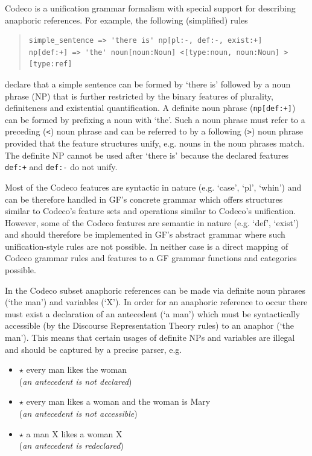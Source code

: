 \documentclass[a4paper]{article}
\begin{document}
Codeco is a unification grammar formalism with special support for describing
anaphoric references. For example, the following (simplified) rules

\small
\begin{quote}
\begin{verbatim}
simple_sentence => 'there is' np[pl:-, def:-, exist:+]
np[def:+] => 'the' noun[noun:Noun] <[type:noun, noun:Noun] >[type:ref]
\end{verbatim}
\end{quote}
\normalsize

declare that a simple
sentence can be formed by `there is' followed by
a noun phrase (NP) that is further restricted by the binary features of
plurality, definiteness and existential quantification.
A definite noun phrase (\verb!np[def:+]!) can be formed by prefixing
a noun with `the'. Such a noun phrase
must refer to a preceding (\verb!<!) noun phrase and can be referred to by a
following (\verb!>!) noun phrase provided that the feature structures
unify, e.g. nouns in the noun phrases match.
The definite NP cannot be used after `there is' because the
declared features \verb!def:+! and \verb!def:-! do not unify.

Most of the Codeco features are syntactic in nature (e.g. `case', `pl', `whin')
and can be therefore handled in
GF's concrete grammar which offers structures similar to Codeco's feature
sets and operations similar to Codeco's unification. However, some of the
Codeco features are semantic in nature (e.g. `def', `exist')
and should therefore be
implemented in GF's abstract grammar where such unification-style rules are
not possible. In neither case is a direct mapping of Codeco grammar rules
and features to a GF grammar functions and categories possible.

In the Codeco subset anaphoric references can be made via definite noun
phrases (`the man') and variables (`X'). In order for an anaphoric reference
to occur there must exist a declaration of an antecedent (`a man') which must
be syntactically accessible (by the Discourse Representation Theory rules)
to an anaphor (`the man'). This means that certain usages of definite NPs
and variables are illegal and should be captured by a precise parser, e.g.

\begin{itemize}
\item $\star$ every man likes the woman \hfill \\
(\emph{an antecedent is not declared})
\item $\star$ every man likes a woman and the woman is Mary \hfill \\
(\emph{an antecedent is not accessible})
\item $\star$ a man X likes a woman X \hfill \\
(\emph{an antecedent is redeclared})
\end{itemize}
\end{document}

